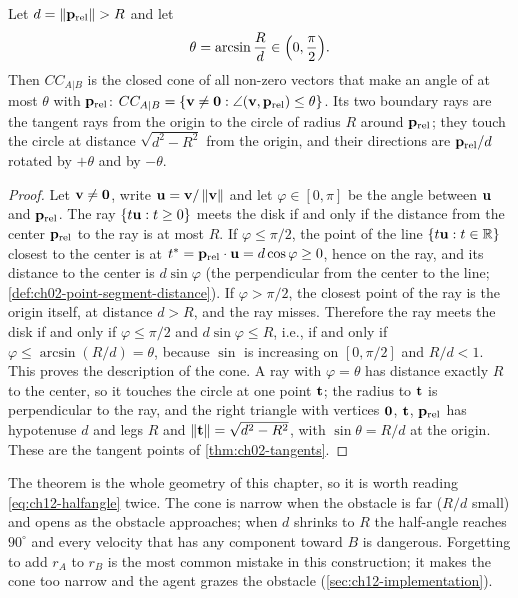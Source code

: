 \begin{theorem}
\label{thm:ch12-cone}
Let $d = \left\lVert \mathbf{p}_{\mathrm{rel}} \right\rVert > R$ and let
\begin{equation}
  \theta = \arcsin\frac{R}{d} \in \Bigl(0, \frac{\pi}{2}\Bigr).
  \label{eq:ch12-halfangle}
\end{equation}
Then $CC_{A|B}$ is the closed cone of all non-zero vectors that make an angle
of at most $\theta$ with $\mathbf{p}_{\mathrm{rel}}$:
$CC_{A|B} = \left\{ \mathbf{v} \ne \mathbf{0} : \angle(\mathbf{v}, \mathbf{p}_{\mathrm{rel}}) \le \theta \right\}$.
Its two boundary rays are the tangent rays from the origin to the circle of
radius $R$ around $\mathbf{p}_{\mathrm{rel}}$; they touch the circle at distance
$\sqrt{d^2 - R^2}$ from the origin, and their directions are
$\mathbf{p}_{\mathrm{rel}}/d$ rotated by $+\theta$ and by $-\theta$.
\end{theorem}
\begin{proof}
Let $\mathbf{v} \ne \mathbf{0}$, write $\mathbf{u} = \mathbf{v}/\left\lVert \mathbf{v} \right\rVert$ and let $\varphi
\in [0,\pi]$ be the angle between $\mathbf{u}$ and $\mathbf{p}_{\mathrm{rel}}$. The ray
$\left\{ t\mathbf{u} : t \ge 0 \right\}$ meets the disk if and only if the distance from the
center $\mathbf{p}_{\mathrm{rel}}$ to the ray is at most $R$. If $\varphi \le \pi/2$,
the point of the line $\left\{ t\mathbf{u} : t \in \mathbb{R} \right\}$ closest to the center is at
$t^* = \mathbf{p}_{\mathrm{rel}}\cdot\mathbf{u} = d\cos\varphi \ge 0$, hence on the ray,
and its distance to the center is $d\sin\varphi$ (the perpendicular from the
center to the line; \cref{def:ch02-point-segment-distance}). If
$\varphi > \pi/2$, the closest point of the ray is the origin itself, at
distance $d > R$, and the ray misses. Therefore the ray meets the disk if and
only if $\varphi \le \pi/2$ and $d\sin\varphi \le R$, i.e., if and only if
$\varphi \le \arcsin(R/d) = \theta$, because $\sin$ is increasing on
$[0,\pi/2]$ and $R/d < 1$. This proves the description of the cone. A ray with
$\varphi = \theta$ has distance exactly $R$ to the center, so it touches the
circle at one point $\mathbf{t}$; the radius to $\mathbf{t}$ is perpendicular to the
ray, and the right triangle with vertices $\mathbf{0}$, $\mathbf{t}$,
$\mathbf{p}_{\mathrm{rel}}$ has hypotenuse $d$ and legs $R$ and
$\left\lVert \mathbf{t} \right\rVert = \sqrt{d^2-R^2}$, with $\sin\theta = R/d$ at the origin. These
are the tangent points of \cref{thm:ch02-tangents}. \qedhere
\end{proof}

The theorem is the whole geometry of this chapter, so it is worth reading
\cref{eq:ch12-halfangle} twice. The cone is narrow when the obstacle is far
($R/d$ small) and opens as the obstacle approaches; when $d$ shrinks to $R$ the
half-angle reaches $90^\circ$ and every velocity that has any component
toward $B$ is dangerous. Forgetting to add $r_A$ to $r_B$ is the most common
mistake in this construction; it makes the cone too narrow and the agent
grazes the obstacle (\cref{sec:ch12-implementation}).

